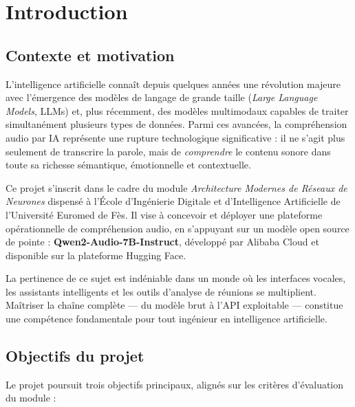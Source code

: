 \documentclass[12pt,a4paper]{report}
\begin{document}
\chapter{Introduction}

\section{Contexte et motivation}

L'intelligence artificielle connaît depuis quelques années une révolution majeure avec
l'émergence des modèles de langage de grande taille (\textit{Large Language Models}, LLMs)
et, plus récemment, des modèles multimodaux capables de traiter simultanément plusieurs
types de données. Parmi ces avancées, la compréhension audio par IA représente une rupture
technologique significative : il ne s'agit plus seulement de transcrire la parole, mais de
\textit{comprendre} le contenu sonore dans toute sa richesse sémantique, émotionnelle et
contextuelle.

Ce projet s'inscrit dans le cadre du module \textit{Architecture Modernes de Réseaux de
Neurones} dispensé à l'École d'Ingénierie Digitale et d'Intelligence Artificielle de
l'Université Euromed de Fès. Il vise à concevoir et déployer une plateforme opérationnelle
de compréhension audio, en s'appuyant sur un modèle open source de pointe :
\textbf{Qwen2-Audio-7B-Instruct}, développé par Alibaba Cloud et disponible sur la
plateforme Hugging Face.

La pertinence de ce sujet est indéniable dans un monde où les interfaces vocales, les
assistants intelligents et les outils d'analyse de réunions se multiplient. Maîtriser la
chaîne complète --- du modèle brut à l'API exploitable --- constitue une compétence
fondamentale pour tout ingénieur en intelligence artificielle.

\section{Objectifs du projet}

Le projet poursuit trois objectifs principaux, alignés sur les critères d'évaluation du
module :
\end{document}
